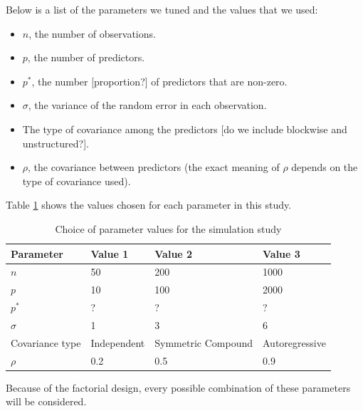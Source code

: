 \documentclass{article}
\begin{document}
Below is a list of the parameters we tuned and the values that we used:
\begin{itemize}
	\item $n$, the number of observations.
	\item $p$, the number of predictors.
	\item $p^\ast$, the number [proportion?] of predictors that are non-zero.
	\item $\sigma$, the variance of the random error in each observation.
	\item The type of covariance among the predictors [do we include blockwise and unstructured?].
	\item $\rho$, the covariance between predictors (the exact meaning of $\rho$ depends on the type of covariance used).
\end{itemize}

Table \ref{tab:simulation-parameters} shows the values chosen for each parameter in this study.
\begin{table}[h]
	\caption{Choice of parameter values for the simulation study}
	\label{tab:simulation-parameters}
	\begin{tabular}{l|lll}
		Parameter       & Value 1     & Value 2            & Value 3        \\ \hline
		$n$             & 50          & 200                & 1000           \\
		$p$             & 10          & 100                & 2000           \\
		$p^\ast$        & ?           & ?                  & ?              \\
		$\sigma$        & 1           & 3                  & 6              \\
		Covariance type & Independent & Symmetric Compound & Autoregressive \\
		$\rho$          & 0.2         & 0.5                & 0.9           
	\end{tabular}
\end{table}

Because of the factorial design, every possible combination of these parameters will be considered.
\end{document}
